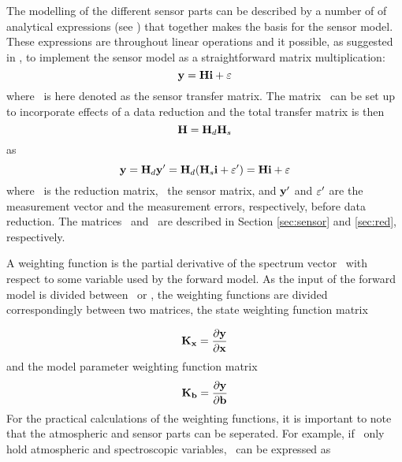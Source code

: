  The modelling of the different sensor parts can be described by a
 number of of analytical expressions (see \citet{eriksson:97a}) that
 together makes the basis for the sensor model. These expressions are
 throughout linear operations and it possible, as suggested in
 \citet{eriksson:00a}, to implement the sensor model as a
 straightforward matrix multiplication:
 \begin{equation}
   \mathbf{y} = \mathbf{H} \mathbf{i} + \varepsilon
  \label{eq:formalism:H}
 \end{equation}
 where \Hm\ is here denoted as the sensor transfer matrix.  The matrix
 \Hm\ can  be set up to incorporate effects of a data reduction and
 the total transfer matrix is then
 \begin{equation}
   \mathbf{H} = \mathbf{H}_d \mathbf{H}_s
  \label{eq:formalism:Hs}
 \end{equation}
 as
 \begin{equation}
   \mathbf{y} = \mathbf{H}_d \mathbf{y}' = \mathbf{H}_d (\mathbf{H}_s \mathbf{i} + \varepsilon') = \mathbf{H} \mathbf{i} + \varepsilon
  \label{eq:formalism:datared}
 \end{equation}
 where \Hd\ is the reduction matrix, \Hs\ the sensor matrix, and $\mathbf{y}'$
 and $\varepsilon'$ are the measurement vector and the measurement errors,
 respectively, before data reduction. The matrices \Hd\ and \Hs\ are
 described in Section \ref{sec:sensor} and \ref{sec:red}, respectively.



 \label{sec:formalism:wfuns}

 A weighting function is the partial derivative of the spectrum vector
 \y\ with respect to some variable used by the forward model.  As the
 input of the forward model is divided between \xt\ or \bt, the
 weighting functions are divided correspondingly between two matrices,
 the state weighting function matrix

 \begin{equation}
   \mathbf{K_x} = \frac{\partial \mathbf{y}}{\partial \mathbf{x}}
  \label{eq:formalism:kx}
 \end{equation}
 and the model parameter weighting function matrix
 \begin{equation}
   \mathbf{K_b} = \frac{\partial \mathbf{y}}{\partial \mathbf{b}}
  \label{eq:formalism:kb}
 \end{equation}
 For the practical calculations of the weighting functions, it is
 important to note that the atmospheric and sensor parts can be
 seperated. For example, if \xt\ only hold atmospheric and
 spectroscopic variables, \Kx\ can be expressed as

